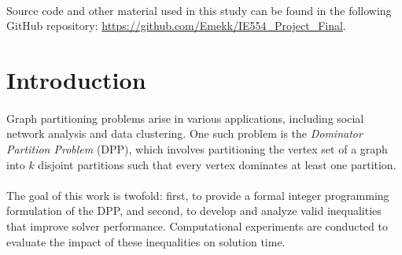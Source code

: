 \paragraph{} Source code and other material used in this study can be found in the following GitHub repository: \url{https://github.com/Emekk/IE554_Project_Final}. 

\section{Introduction}
\label{sec:introduction}


\paragraph{} Graph partitioning problems arise in various applications, including social network analysis and data clustering. One such problem is the \textit{Dominator Partition Problem} (DPP), which involves partitioning the vertex set of a graph into $k$ disjoint partitions such that every vertex dominates at least one partition.

\paragraph{} The goal of this work is twofold: first, to provide a formal integer programming formulation of the DPP, and second, to develop and analyze valid inequalities that improve solver performance. Computational experiments are conducted to evaluate the impact of these inequalities on solution time.
